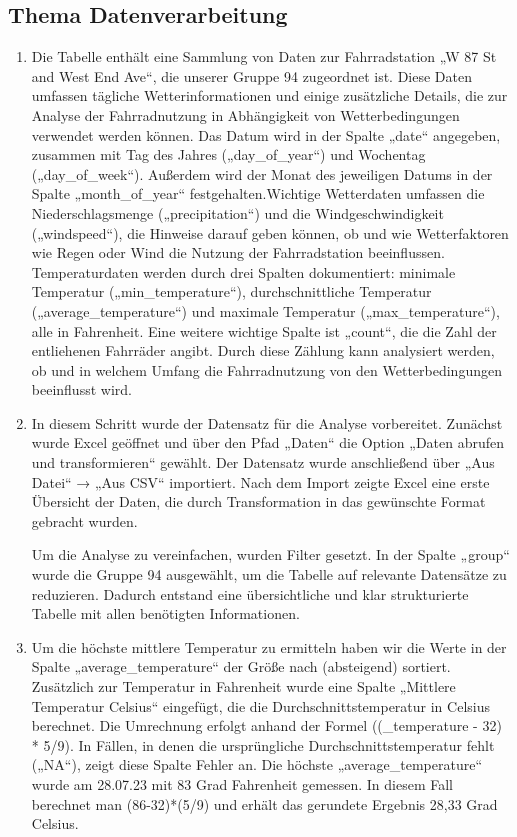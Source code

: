 \documentclass{article}
\begin{document}
\subsection{Thema Datenverarbeitung}
\begin{enumerate}
 \item Die Tabelle enthält eine Sammlung von Daten zur Fahrradstation „W 87 St and West End Ave“, die unserer Gruppe 94 zugeordnet ist. Diese Daten umfassen tägliche Wetterinformationen und einige zusätzliche Details, die zur Analyse der Fahrradnutzung in Abhängigkeit von Wetterbedingungen verwendet werden können.
Das Datum wird in der Spalte „date“ angegeben, zusammen mit Tag des Jahres („day\_of\_year“) und Wochentag („day\_of\_week“). Außerdem wird der Monat des jeweiligen Datums in der Spalte „month\_of\_year“ festgehalten.Wichtige Wetterdaten umfassen die Niederschlagsmenge („precipitation“) und die Windgeschwindigkeit („windspeed“), die Hinweise darauf geben können, ob und wie Wetterfaktoren wie Regen oder Wind die Nutzung der Fahrradstation beeinflussen. Temperaturdaten werden durch drei Spalten dokumentiert: minimale Temperatur („min\_temperature“), durchschnittliche Temperatur („average\_temperature“) und maximale Temperatur („max\_temperature“), alle in Fahrenheit. 
Eine weitere wichtige Spalte ist „count“, die die Zahl der entliehenen Fahrräder angibt. Durch diese Zählung kann analysiert werden, ob und in welchem Umfang die Fahrradnutzung von den Wetterbedingungen beeinflusst wird.
\item In diesem Schritt wurde der Datensatz für die Analyse vorbereitet. Zunächst wurde Excel geöffnet und über den Pfad „Daten“ die Option „Daten abrufen und transformieren“ gewählt. Der Datensatz wurde anschließend über „Aus Datei“ → „Aus CSV“ importiert. Nach dem Import zeigte Excel eine erste Übersicht der Daten, die durch Transformation in das gewünschte Format gebracht wurden.

Um die Analyse zu vereinfachen, wurden Filter gesetzt. In der Spalte „group“ wurde die Gruppe 94 ausgewählt, um die Tabelle auf relevante Datensätze zu reduzieren. Dadurch entstand eine übersichtliche und klar strukturierte Tabelle mit allen benötigten Informationen.
\item Um die höchste mittlere Temperatur zu ermitteln haben wir die Werte in der Spalte „average\_temperature“ der Größe nach (absteigend) sortiert. 
Zusätzlich zur Temperatur in Fahrenheit wurde eine Spalte „Mittlere Temperatur Celsius“ eingefügt, die die Durchschnittstemperatur in Celsius berechnet. Die Umrechnung erfolgt anhand der Formel ((\_temperature - 32) * 5/9). In Fällen, in denen die ursprüngliche Durchschnittstemperatur fehlt („NA“), zeigt diese Spalte Fehler an. Die höchste „average\_temperature“ wurde am 28.07.23 mit 83 Grad Fahrenheit gemessen. In diesem Fall berechnet man (86-32)*(5/9) und erhält das gerundete Ergebnis 28,33 Grad Celsius.


\end{enumerate}
\end{document}
